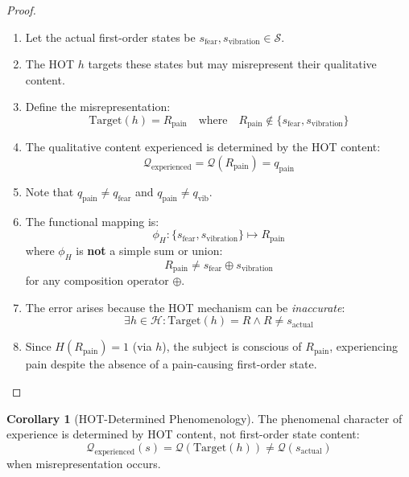 \documentclass[11pt,a4paper]{article}
\theoremstyle{definition}
\newtheorem{corollary}{Corollary}[section]
\theoremstyle{remark}
\newcommand{\Sset}{\mathcal{S}}
\newcommand{\Q}{\mathcal{Q}}
\newcommand{\Hset}{\mathcal{H}}
\newcommand{\Target}{\text{Target}}
\begin{document}
\begin{proof}
\begin{enumerate}
    \item Let the actual first-order states be $s_{\text{fear}}, s_{\text{vibration}} \in \Sset$.
    \item The HOT $h$ targets these states but may misrepresent their qualitative content.
    \item Define the misrepresentation:
    \begin{equation}
    \Target(h) = R_{\text{pain}} \quad \text{where} \quad R_{\text{pain}} \notin \{s_{\text{fear}}, s_{\text{vibration}}\}
    \end{equation}
    \item The qualitative content experienced is determined by the HOT content:
    \begin{equation}
    \Q_{\text{experienced}} = \Q(R_{\text{pain}}) = q_{\text{pain}}
    \end{equation}
    \item Note that $q_{\text{pain}} \neq q_{\text{fear}}$ and $q_{\text{pain}} \neq q_{\text{vib}}$.
    \item The functional mapping is:
    \begin{equation}
    \phi_H: \{s_{\text{fear}}, s_{\text{vibration}}\} \mapsto R_{\text{pain}}
    \end{equation}
    where $\phi_H$ is \textbf{not} a simple sum or union:
    \begin{equation}
    R_{\text{pain}} \neq s_{\text{fear}} \oplus s_{\text{vibration}}
    \end{equation}
    for any composition operator $\oplus$.
    \item The error arises because the HOT mechanism can be \textit{inaccurate}:
    \begin{equation}
    \exists h \in \Hset : \Target(h) = R \land R \neq s_{\text{actual}}
    \end{equation}
    \item Since $H(R_{\text{pain}}) = 1$ (via $h$), the subject is conscious of $R_{\text{pain}}$, experiencing pain despite the absence of a pain-causing first-order state. \qedhere
\end{enumerate}
\end{proof}

\begin{corollary}[HOT-Determined Phenomenology]
\label{cor:HOT-phenom}
The phenomenal character of experience is determined by HOT content, not first-order state content:
\begin{equation}
\Q_{\text{experienced}}(s) = \Q(\Target(h)) \neq \Q(s_{\text{actual}})
\end{equation}
when misrepresentation occurs.
\end{corollary}
\end{document}
